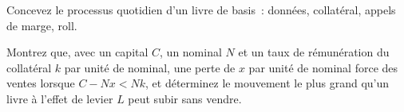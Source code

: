 \begin{interviewq}\label{iq:s2:the-bond-futures-basis-trade:5}
Concevez le processus quotidien d'un livre de basis~: données, collatéral, appels de marge, roll.
\end{interviewq}

\begin{interviewq}\label{iq:s2:the-bond-futures-basis-trade:6}
Montrez que, avec un capital $C$, un nominal $N$ et un taux de rémunération du collatéral $k$ par unité de nominal, une perte de $x$ par unité de nominal force des ventes lorsque $C - Nx < Nk$, et déterminez
le mouvement le plus grand qu'un livre à l'effet de levier $L$ peut subir sans vendre.
\end{interviewq}
